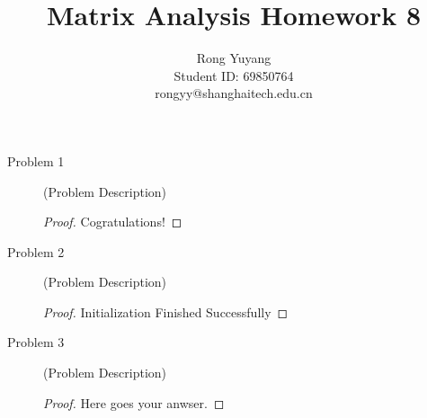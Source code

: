 \documentclass{article}
\title{Matrix Analysis Homework 8}
\author{Rong Yuyang \\ Student ID: 69850764 \\ rongyy@shanghaitech.edu.cn}
\begin{document}
\maketitle

\begin{description}
	\item[Problem 1] (Problem Description)
	\begin{proof}
		
		Cogratulations!

	\end{proof}

	\item[Problem 2] (Problem Description)
	\begin{proof}
	
		Initialization Finished Successfully

	\end{proof}

	\item[Problem 3] (Problem Description)
	\begin{proof}

		Here goes your anwser.

	\end{proof}
\end{description}
\end{document}
